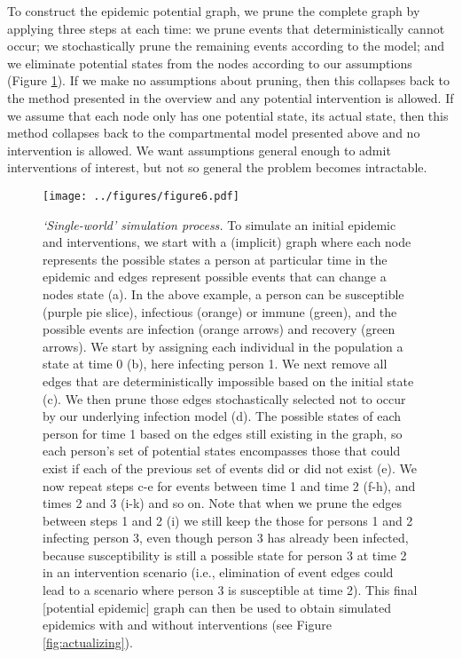 \documentclass[PTRSB]{rsos}
\makeatletter
\def\checkGraphicsWidth{\ifdim\Gin@nat@width>\linewidth
	\tsGraphicsScaleX\linewidth\else\Gin@nat@width\fi}
\let\ts@includegraphics\includegraphics
\renewcommand{\includegraphics}[1]{\ts@includegraphics[width=\checkGraphicsWidth]{#1}}
\makeatother
\begin{document}
\begin{multicols}{2}
To construct the epidemic potential graph, we prune the complete graph by applying three steps at each time: we prune events that deterministically cannot occur; we stochastically prune the remaining events according to the model; and we eliminate potential states from the nodes according to our assumptions (Figure \ref{fig:pruning}).
If we make no assumptions about pruning, then this collapses back to the method presented in the overview and any potential intervention is allowed.
If we assume that each node only has one potential state, its actual state, then this method collapses back to the compartmental model presented above and no intervention is allowed.
We want assumptions general enough to admit interventions of interest, but not so general the problem becomes intractable.

\begin{figure}[hp]
\texttt{[image: ../figures/figure6.pdf]}
\caption{\textit{‘Single-world’ simulation process.}
  To simulate an initial epidemic and interventions, we start with a (implicit) graph where each node represents the possible states a person at particular time in the epidemic and edges represent possible events that can change a nodes state (a).
  In the above example, a person can be susceptible (purple pie slice), infectious (orange) or immune (green), and the possible events are infection (orange arrows) and recovery (green arrows).
  We start by assigning each individual in the population a state at time 0 (b), here infecting person 1.
  We next remove all edges that are deterministically impossible based on the initial state (c).
  We then prune those edges stochastically selected not to occur by our underlying infection model (d).
  The possible states of each person for time 1 based on the edges still existing in the graph, so each person’s set of potential states encompasses those that could exist if each of the previous set of events did or did not exist (e).
  We now repeat steps c-e for events between time 1 and time 2 (f-h), and times 2 and 3 (i-k) and so on.
  Note that when we prune the edges between steps 1 and 2 (i) we still keep the those for persons 1 and 2 infecting person 3, even though person 3 has already been infected, because susceptibility is still a possible state for person 3 at time 2 in an intervention scenario (i.e., elimination of event edges could lead to a scenario where person 3 is susceptible at time 2).
  This final [potential epidemic] graph can then be used to obtain simulated epidemics with and without interventions (see Figure \ref{fig:actualizing}).
}
\label{fig:pruning}
\end{figure}


\end{multicols}
\end{document}
